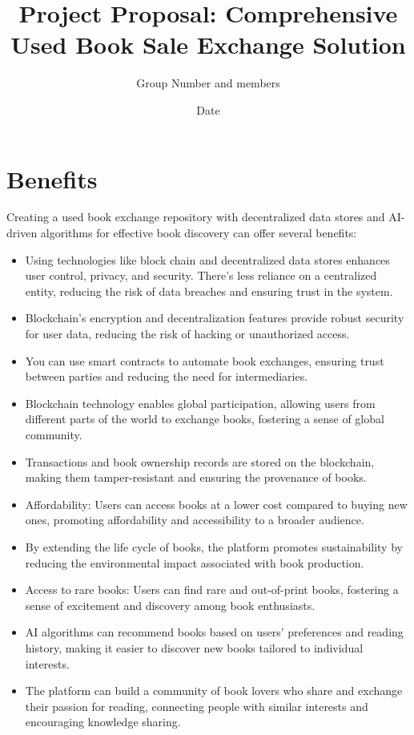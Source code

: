 \documentclass{article}
\begin{document}
\title{Project Proposal: Comprehensive Used Book Sale Exchange Solution}
\author{Group Number and members}
\date{Date}
\maketitle

\tableofcontents
\newpage

\section{Benefits}
Creating a used book exchange repository with decentralized data stores and AI-driven algorithms for effective book discovery can offer several benefits:

\begin{itemize}
\item Using technologies like block chain and decentralized data stores enhances user control, privacy, and security. There's less reliance on a centralized entity, reducing the risk of data breaches and ensuring trust in the system.
\item Blockchain's encryption and decentralization features provide robust security for user data, reducing the risk of hacking or unauthorized access.
\item You can use smart contracts to automate book exchanges, ensuring trust between parties and reducing the need for intermediaries.
\item Blockchain technology enables global participation, allowing users from different parts of the world to exchange books, fostering a sense of global community.

\item Transactions and book ownership records are stored on the blockchain, making them tamper-resistant and ensuring the provenance of books.
\item Affordability: Users can access books at a lower cost compared to buying new ones, promoting affordability and accessibility to a broader audience.

\item By extending the life cycle of books, the platform promotes sustainability by reducing the environmental impact associated with book production.
\item Access to rare books: Users can find rare and out-of-print books, fostering a sense of excitement and discovery among book enthusiasts.
\item AI algorithms can recommend books based on users' preferences and reading history, making it easier to discover new books tailored to individual interests.
\item The platform can build a community of book lovers who share and exchange their passion for reading, connecting people with similar interests and encouraging knowledge sharing.


\end{itemize}
\end{document}
